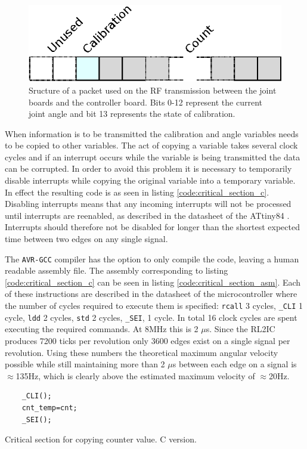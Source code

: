 \begin{figure}[h]
	\centering
	\includegraphics[width=.5\linewidth]{graphics/rf_packet}
	\caption[RF transmission packet used from the joint board.]{Sructure of a packet used on the RF transmission between the joint boards and the controller board. Bits 0-12 represent the current joint angle and bit 13 represents the state of calibration.}
	\label{fig:rfpacket}
\end{figure}

When information is to be transmitted the calibration and angle variables needs to be copied to other variables.
The act of copying a variable takes several clock cycles and if an interrupt occurs while the variable is being transmitted the data can be corrupted.
In order to avoid this problem it is necessary to temporarily disable interrupts while copying the original variable into a temporary variable. 
In effect the resulting code is as seen in listing \ref{code:critical_section_c}.
Disabling interrupts means that any incoming interrupts will not be processed until interrupts are reenabled, as described in the datasheet of the ATtiny84 \cite{attiny84}.
Interrupts should therefore not be disabled for longer than the shortest expected time between two edges on any single signal.

The \texttt{AVR-GCC} compiler has the option to only compile the code, leaving a human readable assembly file.
The assembly corresponding to listing \ref{code:critical_section_c} can be seen in listing \ref{code:critical_section_asm}.
Each of these instructions are described in the datasheet of the microcontroller where the number of cycles required to execute them is specified: \texttt{rcall} 3 cycles, \texttt{\_CLI} 1 cycle, \texttt{ldd} 2 cycles, \texttt{std} 2 cycles, \texttt{\_SEI}, 1 cycle.
In total 16 clock cycles are spent executing the required commands.
At 8MHz this is 2 $\mu$s.
Since the RL2IC produces 7200 ticks per revolution only 3600 edges exist on a single signal per revolution. 
Using these numbers the theoretical maximum angular velocity possible while still maintaining more than 2 $\mu$s between each edge on a signal is $\approx$135Hz, which is clearly above the estimated maximum velocity of $\approx$20Hz.

\begin{listing}[h] 
\begin{verbatim}
	_CLI();
	cnt_temp=cnt;
	_SEI();
\end{verbatim}
\caption{Critical section for copying counter value. C version.}
\label{code:critical_section_c}
\end{listing}

